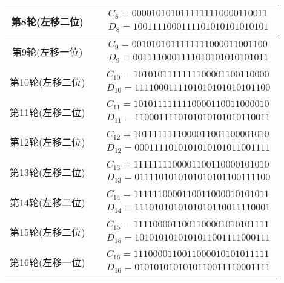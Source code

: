 \documentclass[UTF8]{ctexart}
\begin{document}
\begin{table}
\begin{tabular}{|c|c|}
            \hline
            第8轮(左移二位) & $\begin{aligned} &C_8=0000101010111111110000110011\\ &D_8=1001111000111101010101010101 \end{aligned}$ \\
            \hline
            第9轮(左移一位) & $\begin{aligned} &C_9=0010101011111111000011001100\\ &D_9=0011110001111010101010101011 \end{aligned}$ \\
            \hline
            第10轮(左移二位) & $\begin{aligned} &C_{10}=1010101111111100001100110000\\ &D_{10}=1111000111101010101010101100 \end{aligned}$ \\
            \hline
            第11轮(左移二位) & $\begin{aligned} &C_{11}=1010111111110000110011000010\\ &D_{11}=1100011110101010101010110011 \end{aligned}$ \\
            \hline
            第12轮(左移二位) & $\begin{aligned} &C_{12}=1011111111000011001100001010\\ &D_{12}=0001111010101010101011001111 \end{aligned}$ \\
            \hline
            第13轮(左移二位) & $\begin{aligned} &C_{13}=1111111100001100110000101010\\ &D_{13}=0111101010101010101100111100 \end{aligned}$ \\
            \hline
            第14轮(左移二位) & $\begin{aligned} &C_{14}=1111110000110011000010101011\\ &D_{14}=1110101010101010110011110001 \end{aligned}$ \\
            \hline
            第15轮(左移二位) & $\begin{aligned} &C_{15}=1111000011001100001010101111\\ &D_{15}=1010101010101011001111000111 \end{aligned}$ \\
            \hline
            第16轮(左移一位) & $\begin{aligned} &C_{16}=1110000110011000010101011111\\ &D_{16}=0101010101010110011110001111 \end{aligned}$ \\
            \hline
        \end{tabular}
    \end{table}
\end{document}
